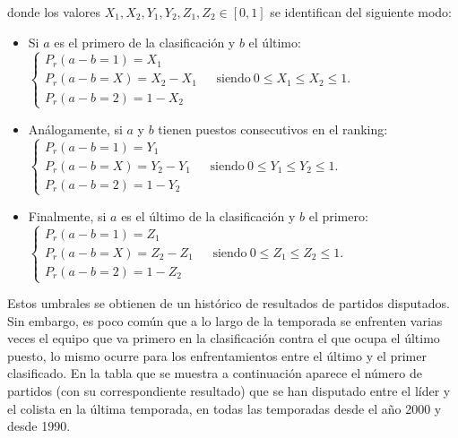 donde los valores $X_{1},X_{2},Y_{1},Y_{2},Z_{1},Z_{2} \in [0,1]$ se identifican del siguiente modo:
\newpage
\begin{itemize}
	\item Si $a$ es el primero de la clasificación y $b$ el último:\\
	 
	 $\begin{cases}
	 	P_{r}(a-b=1)=X_{1}\\
	 	P_{r}(a-b=X)=X_{2}-X_{1} \ \ \ \ \ \ \ \text{siendo} \ 0 \leq X_{1} \leq X_{2} \leq 1.\\
	 	P_{r}(a-b=2)=1-X_{2} 
	 \end{cases}$\\
	 
	\item Análogamente, si $a$ y $b$ tienen puestos consecutivos en el ranking:\\
	
	$\begin{cases}
	P_{r}(a-b=1)=Y_{1}\\
	P_{r}(a-b=X)=Y_{2}-Y_{1} \ \ \ \ \ \ \ \text{siendo} \ 0 \leq Y_{1} \leq Y_{2} \leq 1.\\
	P_{r}(a-b=2)=1-Y_{2} 
	\end{cases}$\\
	
	\item Finalmente, si $a$ es el último de la clasificación y $b$ el primero:\\
	
	$\begin{cases}
	P_{r}(a-b=1)=Z_{1}\\
	P_{r}(a-b=X)=Z_{2}-Z_{1} \ \ \ \ \ \ \ \text{siendo} \ 0 \leq Z_{1} \leq Z_{2} \leq 1.\\
	P_{r}(a-b=2)=1-Z_{2} 
	\end{cases}$
\end{itemize}

Estos umbrales se obtienen de un histórico de resultados de partidos disputados. Sin embargo, es poco común que a lo largo de la temporada se enfrenten varias veces el equipo que va primero en la clasificación contra el que ocupa el último puesto, lo mismo ocurre para los enfrentamientos entre el último y el primer clasificado. En la tabla que se muestra a continuación aparece el número de partidos (con su correspondiente resultado) que se han disputado entre el líder y el colista en la última temporada, en todas las temporadas desde el año 2000 y desde 1990.

